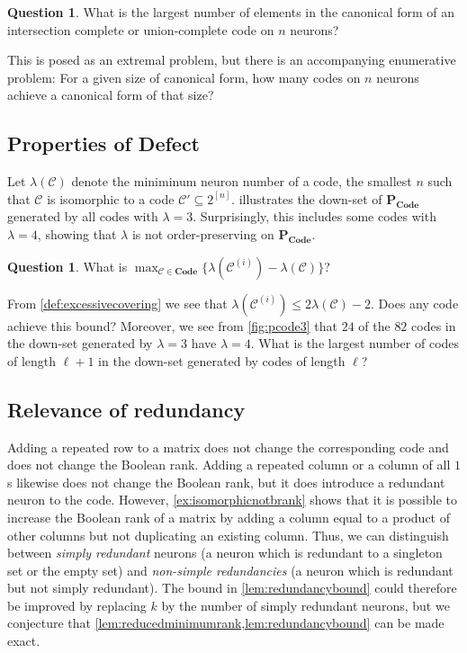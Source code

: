 \documentclass[11pt,letterpaper, reqno]{amsart}
\theoremstyle{definition}
\newtheorem{question}[thm]{Question}
\def\cC{\mathcal{C}}
\def\pcode{\mathbf{P_{Code}}}
\def\code{\mathbf{Code}}
\begin{document}
    \begin{question}
        What is the largest number of elements in the canonical form of an intersection complete or union-complete code on $n$ neurons?
    \end{question}
    \noindent This is posed as an extremal problem, but there is an accompanying enumerative problem: For a given size of canonical form, how many codes on $n$ neurons achieve a canonical form of that size? 

\subsection{Properties of Defect}
    Let $\lambda(\cC)$ denote the miniminum neuron number of a code, the smallest $n$ such that $\cC$ is isomorphic to a code $\cC' \subseteq 2^{[n]}$.
     illustrates the down-set of $\pcode$ generated by all codes with $\lambda = 3$.
    Surprisingly, this includes some codes with $\lambda = 4$, showing that $\lambda$ is not order-preserving on $\pcode$.
    \begin{question}
        What is $\max_{\cC \in \code} \{\lambda(\cC^{(i)}) - \lambda(\cC)\}$?
    \end{question}
    From \cref{def:excessivecovering} we see that $\lambda(\cC^{(i)}) \leq 2\lambda(\cC) - 2$. Does any code achieve this bound? Moreover, we see from \cref{fig:pcode3} that $24$ of the $82$ codes in the down-set generated by $\lambda = 3$ have $\lambda = 4$. What is the largest number of codes of length $\ell + 1$ in the down-set generated by codes of length $\ell$?

\subsection{Relevance of redundancy}
    Adding a repeated row to a matrix does not change the corresponding code and does not change the Boolean rank.
    Adding a repeated column or a column of all $1$s likewise does not change the Boolean rank, but it does introduce a redundant neuron to the code. 
    However, \cref{ex:isomorphicnotbrank} shows that it is possible to increase the Boolean rank of a matrix by adding a column equal to a product of other columns but not duplicating an existing column.
    Thus, we can distinguish between \emph{simply redundant} neurons (a neuron which is redundant to a singleton set or the empty set) and \emph{non-simple redundancies} (a neuron which is redundant but not simply redundant). 
    The bound in \cref{lem:redundancybound} could therefore be improved by replacing $k$ by the number of simply redundant neurons, but
    we conjecture that \cref{lem:reducedminimumrank,lem:redundancybound} can be made exact.
\end{document}
